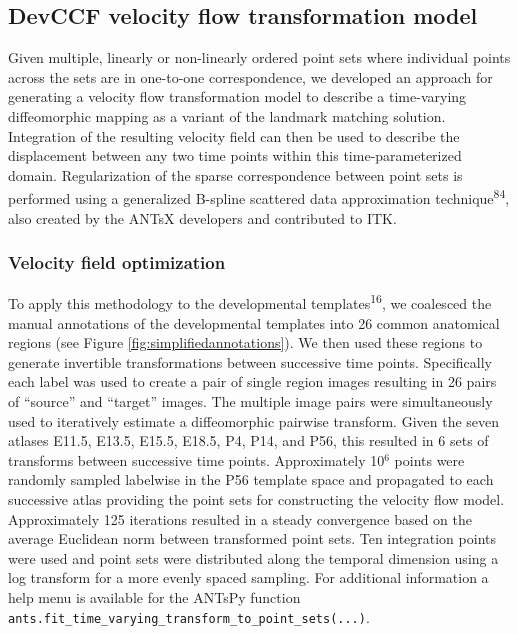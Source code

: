 \documentclass[
  12pt,
]{article}
\begin{document}
\subsection{DevCCF velocity flow transformation
model}\label{devccf-velocity-flow-transformation-model}

Given multiple, linearly or non-linearly ordered point sets where
individual points across the sets are in one-to-one correspondence, we
developed an approach for generating a velocity flow transformation
model to describe a time-varying diffeomorphic mapping as a variant of
the landmark matching solution. Integration of the resulting velocity
field can then be used to describe the displacement between any two time
points within this time-parameterized domain. Regularization of the
sparse correspondence between point sets is performed using a
generalized B-spline scattered data approximation
technique\textsuperscript{84}, also created by the ANTsX developers and
contributed to ITK.

\subsubsection{Velocity field
optimization}\label{velocity-field-optimization-1}

To apply this methodology to the developmental
templates\textsuperscript{16}, we coalesced the manual annotations of
the developmental templates into 26 common anatomical regions (see
Figure \ref{fig:simplifiedannotations}). We then used these regions to
generate invertible transformations between successive time points.
Specifically each label was used to create a pair of single region
images resulting in 26 pairs of ``source'' and ``target'' images. The
multiple image pairs were simultaneously used to iteratively estimate a
diffeomorphic pairwise transform. Given the seven atlases E11.5, E13.5,
E15.5, E18.5, P4, P14, and P56, this resulted in 6 sets of transforms
between successive time points. Approximately 10\(^6\) points were
randomly sampled labelwise in the P56 template space and propagated to
each successive atlas providing the point sets for constructing the
velocity flow model. Approximately 125 iterations resulted in a steady
convergence based on the average Euclidean norm between transformed
point sets. Ten integration points were used and point sets were
distributed along the temporal dimension using a log transform for a
more evenly spaced sampling. For additional information a help menu is
available for the ANTsPy function
\texttt{ants.fit\_time\_varying\_transform\_to\_point\_sets(...)}.
\end{document}
